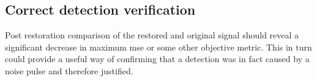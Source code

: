 \subsection{Correct detection verification}
Post restoration comparison of the restored and original signal should reveal a significant decrease in maximum \gls{mse} or some other objective metric. This in turn could provide a useful way of confirming that a detection was in fact caused by a noise pulse and therefore justified.

















%




